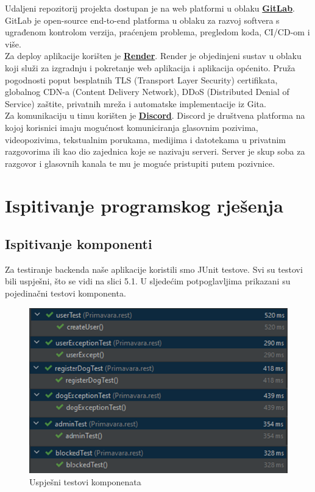 			Udaljeni repozitorij projekta dostupan je na web platformi u oblaku \textbf{\href{https://gitlab.com/}{GitLab}}. GitLab je open-source end-to-end platforma u oblaku za razvoj softvera s ugrađenom kontrolom verzija, praćenjem problema, pregledom koda, CI/CD-om i više.\\
			Za deploy aplikacije korišten je \textbf{\href{https://render.com/}{Render}}. Render je objedinjeni sustav u oblaku koji služi za izgradnju i pokretanje web aplikacija i aplikacija općenito. Pruža pogodnosti poput besplatnih TLS (Transport Layer Security) certifikata, globalnog CDN-a (Content Delivery Network), DDoS (Distributed Denial of Service) zaštite, privatnih mreža i automatske implementacije iz Gita.\\
			Za komunikaciju u timu korišten je \textbf{\href{https://discord.com/}{Discord}}. Discord je društvena platforma na kojoj korisnici imaju mogućnost komuniciranja glasovnim pozivima, videopozivima, tekstualnim porukama, medijima i datotekama u privatnim razgovorima ili kao dio zajednica koje se nazivaju serveri. Server je skup soba za razgovor i glasovnih kanala te mu je moguće pristupiti putem pozivnice.\\
			
			
			\eject 
		
	
		\section{Ispitivanje programskog rješenja}
			
		
			\subsection{Ispitivanje komponenti}
			Za testiranje backenda naše aplikacije koristili smo JUnit testove. Svi su testovi bili uspješni, što se vidi na slici 5.1. U sljedećim potpoglavljima prikazani su pojedinačni testovi komponenta.
			
			\begin{figure}[H]
				\centering
				\includegraphics[width=12cm]{slike/testoviKomponenti}
				\caption{Uspješni testovi komponenata}
				\label{fig:Testovi-komponenta}
			\end{figure}
			
